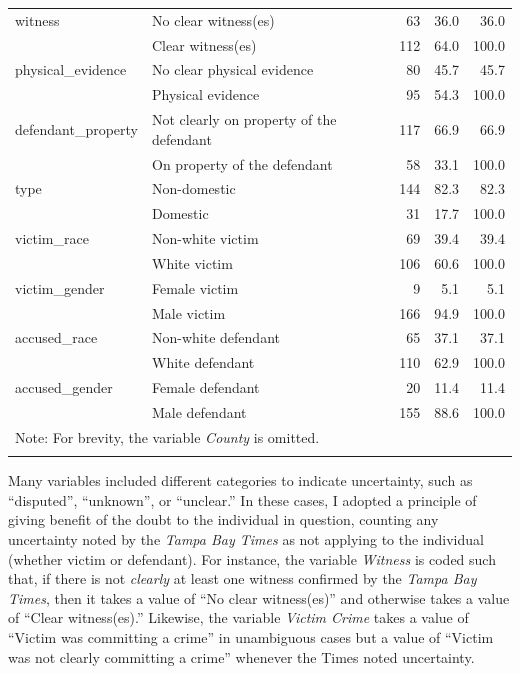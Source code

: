 \documentclass[12pt,article]{article}
\begin{document}
{\begin{longtable}{ll|rrr}
\hline
witness & No clear witness(es)               & 63 & 36.0 & 36.0 \\ 
   & Clear witness(es) & 112 & 64.0 & 100.0 \\ 
\hline
physical\_evidence & No clear physical evidence & 80 & 45.7 & 45.7 \\ 
   & Physical evidence & 95 & 54.3 & 100.0 \\ 
\hline
defendant\_property & Not clearly on property of the defendant & 117 & 66.9 & 66.9 \\ 
   & On property of the defendant & 58 & 33.1 & 100.0 \\ 
\hline
type & Non-domestic                                                                      & 144 & 82.3 & 82.3 \\ 
   & Domestic & 31 & 17.7 & 100.0 \\ 
\hline
victim\_race & Non-white victim & 69 & 39.4 & 39.4 \\ 
   & White victim & 106 & 60.6 & 100.0 \\ 
\hline
victim\_gender & Female victim & 9 & 5.1 & 5.1 \\ 
   & Male victim & 166 & 94.9 & 100.0 \\ 
\hline
accused\_race & Non-white defendant & 65 & 37.1 & 37.1 \\ 
   & White defendant & 110 & 62.9 & 100.0 \\ 
\hline
accused\_gender & Female defendant & 20 & 11.4 & 11.4 \\ 
   & Male defendant & 155 & 88.6 & 100.0 \\ 
   \hline
  \multicolumn{5}{l}{Note: For brevity, the variable \emph{County} is omitted.} \\ \hline
\label{Summary statistics for categorical variables}
\end{longtable}
}
  
\doublespacing

Many variables included different categories to indicate uncertainty,
such as ``disputed'', ``unknown'', or ``unclear.'' In these cases, I
adopted a principle of giving benefit of the doubt to the individual in
question, counting any uncertainty noted by the \emph{Tampa Bay Times}
as not applying to the individual (whether victim or defendant). For
instance, the variable \emph{Witness} is coded such that, if there is
not \emph{clearly} at least one witness confirmed by the \emph{Tampa Bay
Times}, then it takes a value of ``No clear witness(es)'' and otherwise
takes a value of ``Clear witness(es).'' Likewise, the variable
\emph{Victim Crime} takes a value of ``Victim was committing a crime''
in unambiguous cases but a value of ``Victim was not clearly committing
a crime'' whenever the Times noted uncertainty.
\end{document}
